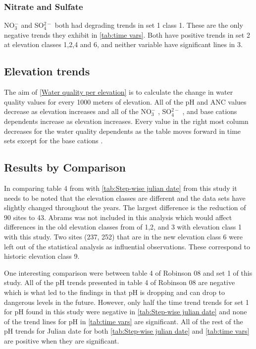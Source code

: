 \subsubsection{Nitrate and Sulfate}

NO$_3^-$ and SO$_4^{2-}$ both had degrading trends in set 1 class 1. These are the only negative trends they exhibit in \autoref{tab:time vars}.  Both have positive trends in set 2 at elevation classes 1,2,4 and 6, and neither variable have significant lines in 3.

\subsection{Elevation trends}

The aim of \autoref{Water quality per elevation} is to calculate the change in water quality values for every 1000 meters of elevation.  All of the pH and ANC values decrease as elevation increases and all of the  NO$_3^-$ , SO$_4^{2-}$ , and base cations dependents increase as elevation increases.  Every value in the right most column decreases for the water quality dependents as the table moves forward in time sets except for the base cations .

\subsection{Results by Comparison}

In comparing table 4 from \citet{robinson2008ph} with \autoref{tab:Step-wise julian date} from this study it needs to be noted that the elevation classes are different and the data sets have slightly changed throughout the years. The largest difference is the reduction of 90 sites to 43. Abrams was not included in this analysis which would affect differences in the old elevation classes from \citet{robinson2008ph} of 1,2, and 3 with elevation class 1 with this study. Two sites (237, 252) that are in the new elevation class 6 were left out of the statistical analysis as influential observations. These correspond to historic elevation class 9.

One interesting comparison were between table 4 of Robinson 08 and set 1 of this study. All of the pH trends presented in table 4 of Robinson 08 are negative which is what led to the findings in \citet{robinson2008ph} that pH is dropping and can drop to dangerous levels in the future. However, only half the time trend trends for set 1 for pH found in this study were negative in \autoref{tab:Step-wise julian date} and none of the trend lines for pH in \autoref{tab:time vars} are significant. All of the rest of the pH trends for Julian date for both \autoref{tab:Step-wise julian date} and \autoref{tab:time vars} are positive when they are significant.

